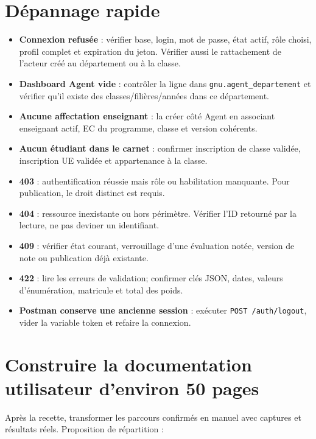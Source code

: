 \documentclass[10pt,a4paper]{article}
\begin{document}
\section{Dépannage rapide}

\begin{itemize}
\item \textbf{Connexion refusée} : vérifier base, login, mot de passe, état actif, rôle choisi, profil complet et expiration du jeton. Vérifier aussi le rattachement de l’acteur créé au département ou à la classe.
\item \textbf{Dashboard Agent vide} : contrôler la ligne dans \texttt{gnu.agent\_departement} et vérifier qu’il existe des classes/filières/années dans ce département.
\item \textbf{Aucune affectation enseignant} : la créer côté Agent en associant enseignant actif, EC du programme, classe et version cohérents.
\item \textbf{Aucun étudiant dans le carnet} : confirmer inscription de classe validée, inscription UE validée et appartenance à la classe.
\item \textbf{403} : authentification réussie mais rôle ou habilitation manquante. Pour publication, le droit distinct est requis.
\item \textbf{404} : ressource inexistante ou hors périmètre. Vérifier l’ID retourné par la lecture, ne pas deviner un identifiant.
\item \textbf{409} : vérifier état courant, verrouillage d’une évaluation notée, version de note ou publication déjà existante.
\item \textbf{422} : lire les erreurs de validation; confirmer clés JSON, dates, valeurs d’énumération, matricule et total des poids.
\item \textbf{Postman conserve une ancienne session} : exécuter \texttt{POST /auth/logout}, vider la variable token et refaire la connexion.
\end{itemize}

\section{Construire la documentation utilisateur d’environ 50 pages}

Après la recette, transformer les parcours confirmés en manuel avec captures et résultats réels. Proposition de répartition :
\end{document}
